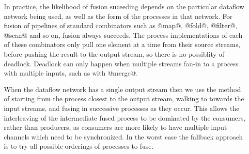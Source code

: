 In practice, the likelihood of fusion suceeding depends on the particular dataflow network being used, as well as the form of the processes in that network. For fusion of pipelines of standard combinators such as @map@, @fold@, @filter@, @scan@ and so on, fusion always succeeds. The process implementations of each of these combinators only pull one element at a time from their source streams, before pushing the result to the output stream, so there is no possiblity of deadlock. Deadlock can only happen when multiple streams fan-in to a process with multiple inputs, such as with @merge@. 

When the dataflow network has a single output stream then we use the method of starting from the process closest to the output stream, walking to towards the input streams, and fusing in successive processes as they occur. This allows the interleaving of the intermediate fused process to be dominated by the consumers, rather than producers, as consumers are more likely to have multiple input channels which need to be synchronized. In the worst case the fallback approach is to try all possible orderings of processes to fuse.








